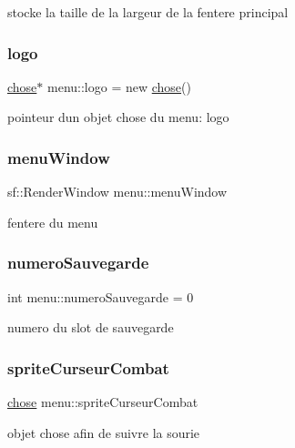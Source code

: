 stocke la taille de la largeur de la fentere principal \mbox{\label{classmenu_a80c548101db506cce4efacb0ed3f7797}} 
\subsubsection{\texorpdfstring{logo}{logo}}
{\footnotesize\ttfamily \mbox{\hyperlink{classchose}{chose}}$\ast$ menu\+::logo = new \mbox{\hyperlink{classchose}{chose}}()}

pointeur d\textquotesingle{}un objet chose du menu\+: logo \mbox{\label{classmenu_a578cdf33520b87a66c91123b56026d47}} 
\subsubsection{\texorpdfstring{menu\+Window}{menuWindow}}
{\footnotesize\ttfamily sf\+::\+Render\+Window menu\+::menu\+Window}

fentere du menu \mbox{\label{classmenu_a0a342635f789b81a24d1b5e8397327b1}} 
\subsubsection{\texorpdfstring{numero\+Sauvegarde}{numeroSauvegarde}}
{\footnotesize\ttfamily int menu\+::numero\+Sauvegarde = 0}

numero du slot de sauvegarde \mbox{\label{classmenu_ac2b4806518d75909e9d6d9fdb6ebf2dc}} 
\subsubsection{\texorpdfstring{sprite\+Curseur\+Combat}{spriteCurseurCombat}}
{\footnotesize\ttfamily \mbox{\hyperlink{classchose}{chose}} menu\+::sprite\+Curseur\+Combat}

objet chose afin de suivre la sourie \mbox{\label{classmenu_a5376bd9808b2c69d5dfd59608077163a}} 
